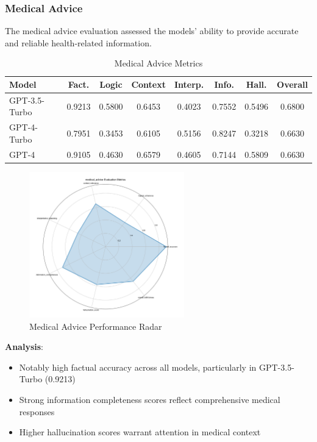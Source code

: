 \subsubsection{Medical Advice}
The medical advice evaluation assessed the models' ability to provide accurate and reliable health-related information.

\begin{table}[!htbp]
\centering
\setlength{\tabcolsep}{4pt}  %
\caption{Medical Advice Metrics}
\label{tab:results_medical_metrics}
\begin{tabular}{|l|c|c|c|c|c|c|c|}
\hline
\textbf{Model} & \textbf{Fact.} & \textbf{Logic} & \textbf{Context} & \textbf{Interp.} 
& \textbf{Info.} & \textbf{Hall.} & \textbf{Overall} \\
\hline
GPT-3.5-Turbo & 0.9213 & 0.5800 & 0.6453 & 0.4023 & 0.7552 & 0.5496 & 0.6800 \\
GPT-4-Turbo & 0.7951 & 0.3453 & 0.6105 & 0.5156 & 0.8247 & 0.3218 & 0.6630 \\
GPT-4 & 0.9105 & 0.4630 & 0.6579 & 0.4605 & 0.7144 & 0.5809 & 0.6630 \\
\hline
\end{tabular}
\end{table}

\begin{figure}[!htbp]
\centering
\includegraphics[width=0.6\textwidth]{figures/types/medical_advice_radar_gpt-4.png}
\caption{Medical Advice Performance Radar}
\label{fig:medical_radar}
\end{figure}

\textbf{Analysis}:
\begin{itemize}
    \item Notably high factual accuracy across all models, particularly in GPT-3.5-Turbo (0.9213)
    \item Strong information completeness scores reflect comprehensive medical responses
    \item Higher hallucination scores warrant attention in medical context
\end{itemize}

